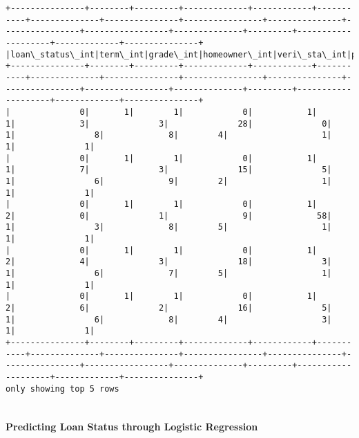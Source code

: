\documentclass[11pt]{article}
\begin{document}
    \begin{Verbatim}[commandchars=\\\{\}]
+---------------+--------+---------+-------------+------------+-----------+--------------+---------------+----------------+---------------+----------------+-----------------+--------------+---------+--------------------+-------------+---------------+
|loan\_status\_int|term\_int|grade\_int|homeowner\_int|veri\_sta\_int|purpose\_int|emp\_length\_int|loan\_amnt\_strat|annual\_inc\_strat|revol\_bal\_strat|revol\_util\_strat|total\_pymnt\_strat|int\_rate\_strat|dti\_strat|inq\_last\_6mths\_strat|pub\_rec\_strat|total\_acc\_strat|
+---------------+--------+---------+-------------+------------+-----------+--------------+---------------+----------------+---------------+----------------+-----------------+--------------+---------+--------------------+-------------+---------------+
|              0|       1|        1|            0|           1|          1|             3|              3|              28|              0|               1|                8|             8|        4|                   1|            1|              1|
|              0|       1|        1|            0|           1|          1|             7|              3|              15|              5|               1|                6|             9|        2|                   1|            1|              1|
|              0|       1|        1|            0|           1|          2|             0|              1|               9|             58|               1|                3|             8|        5|                   1|            1|              1|
|              0|       1|        1|            0|           1|          2|             4|              3|              18|              3|               1|                6|             7|        5|                   1|            1|              1|
|              0|       1|        1|            0|           1|          2|             6|              2|              16|              5|               1|                6|             8|        4|                   3|            1|              1|
+---------------+--------+---------+-------------+------------+-----------+--------------+---------------+----------------+---------------+----------------+-----------------+--------------+---------+--------------------+-------------+---------------+
only showing top 5 rows


    \end{Verbatim}

    \hypertarget{predicting-loan-status-through-logistic-regression}{%
\paragraph{Predicting Loan Status through Logistic
Regression}\label{predicting-loan-status-through-logistic-regression}}
\end{document}
